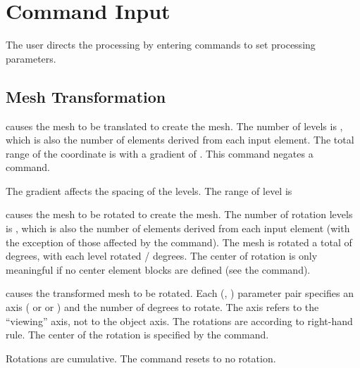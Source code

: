 \chapter{Command Input} \label{chap:command}

The user directs the processing by entering commands to set processing
parameters.


\newpage
\section{Mesh Transformation}
\label{cmd:meshtrans}

 {
 causes the  mesh to be translated to create the
 mesh. The number of levels is , which is also the
number of  elements derived from each input  element.
The total range of the  coordinate is  with a
gradient of . This command negates a  command.

The gradient affects the spacing of the levels. The  range of
level  is
}

 {
 causes the  mesh to be rotated to create the
 mesh. The number of rotation levels is , which is
also the number of  elements derived from each input 
element (with the exception of those affected by the 
command). The mesh is rotated a total of  degrees, with
each level rotated / degrees. The center of
rotation  is only meaningful if no center element blocks
are defined (see the  command).
}

 {
 causes the transformed  mesh to be rotated. Each
(\param{axis}, \param{ndeg}) parameter pair specifies an axis
( or  or ) and the number of degrees to rotate. The
axis refers to the ``viewing'' axis, not to the object axis. The
rotations are according to right-hand rule. The center of the rotation
is specified by the \cmd{REVCEN} command.

Rotations are cumulative. The  command resets to no
rotation.
}

